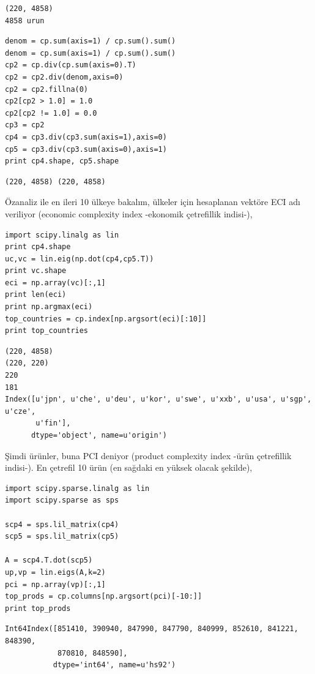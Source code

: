 \documentclass[12pt,fleqn]{article}\usepackage{../../common}
\begin{document}
\begin{verbatim}
(220, 4858)
4858 urun
\end{verbatim}

\begin{verbatim}
denom = cp.sum(axis=1) / cp.sum().sum()
denom = cp.sum(axis=1) / cp.sum().sum()
cp2 = cp.div(cp.sum(axis=0).T)
cp2 = cp2.div(denom,axis=0)
cp2 = cp2.fillna(0)
cp2[cp2 > 1.0] = 1.0
cp2[cp2 != 1.0] = 0.0
cp3 = cp2
cp4 = cp3.div(cp3.sum(axis=1),axis=0)
cp5 = cp3.div(cp3.sum(axis=0),axis=1)
print cp4.shape, cp5.shape
\end{verbatim}

\begin{verbatim}
(220, 4858) (220, 4858)
\end{verbatim}

Özanaliz ile en ileri 10 ülkeye bakalım, ülkeler için hesaplanan vektöre
ECI adı veriliyor (economic complexity index -ekonomik çetrefillik
indisi-),

\begin{verbatim}
import scipy.linalg as lin
print cp4.shape
uc,vc = lin.eig(np.dot(cp4,cp5.T))
print vc.shape
eci = np.array(vc)[:,1]
print len(eci)
print np.argmax(eci)
top_countries = cp.index[np.argsort(eci)[:10]]
print top_countries
\end{verbatim}

\begin{verbatim}
(220, 4858)
(220, 220)
220
181
Index([u'jpn', u'che', u'deu', u'kor', u'swe', u'xxb', u'usa', u'sgp', u'cze',
       u'fin'],
      dtype='object', name=u'origin')
\end{verbatim}

Şimdi ürünler, buna PCI deniyor (product complexity index -ürün çetrefillik
indisi-). En çetrefil 10 ürün (en sağdaki en yüksek olacak şekilde),

\begin{verbatim}
import scipy.sparse.linalg as lin
import scipy.sparse as sps

scp4 = sps.lil_matrix(cp4)
scp5 = sps.lil_matrix(cp5)

A = scp4.T.dot(scp5)
up,vp = lin.eigs(A,k=2)
pci = np.array(vp)[:,1]
top_prods = cp.columns[np.argsort(pci)[-10:]]
print top_prods
\end{verbatim}

\begin{verbatim}
Int64Index([851410, 390940, 847990, 847790, 840999, 852610, 841221, 848390,
            870810, 848590],
           dtype='int64', name=u'hs92')
\end{verbatim}
\end{document}
